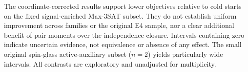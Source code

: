 The coordinate-corrected results support lower objectives relative to
cold starts on the fixed signal-enriched Max-3SAT subset. They do not
establish uniform improvement across families or the original E4 sample,
nor a clear additional benefit of pair moments over the independence
closure. Intervals containing zero indicate uncertain evidence, not
equivalence or absence of any effect. The small original spin-glass
active-auxiliary subset ($n=2$) yields particularly wide intervals.
All contrasts are exploratory and unadjusted for multiplicity.

